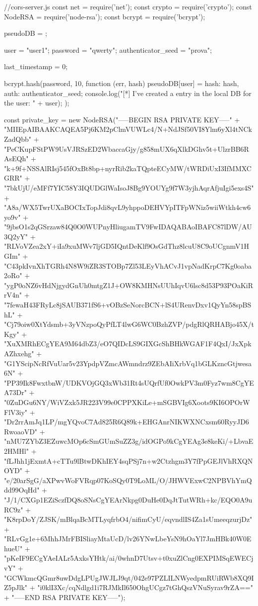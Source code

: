 \begin{js}
//cors-server.js
const net = require('net');
const crypto = require('crypto');
const NodeRSA = require('node-rsa');
const bcrypt = require('bcrypt');

pseudoDB = {};

user = "user1";
password = "qwerty";
authenticator_seed = "prova";

last_timestamp = 0;

bcrypt.hash(password, 10, function (err, hash) {
    pseudoDB[user] = {hash: hash, auth: authenticator_seed};
    console.log("[*] I've created a entry in the local DB for the user: " + user);
});


const private_key = new NodeRSA("-----BEGIN RSA PRIVATE KEY-----\n" +
    "MIIEpAIBAAKCAQEA5Pj6KM2pClmVUWLc4/N+NdJSf50VI8Ylm6yXl4tNCkZadQbb\n" +
    "PeCKupFStPW9UsVJRSzED2WbaccaGjy/g858mUX6qXlkDGhv5t+UlzrBB6RAsEQh\n" +
    "k+9f+NSSAlRIsj545fOxBt8bp+nyrRib2kaTQpteECyMW/tWRDiUxI3IfMMXCGRR\n" +
    "7bkUjU/eMFf7YIC58Y3IQUDGlWaIsoJ8Bg9YOUYg9f7W3yjhAqrAfjuIgi5exs4S\n" +
    "A8a/WX5TwrUXaBOCIxTopJdi8qvL9yhppoDEHVYpITFpWNiz5wiiWtkh4cw6yo9v\n" +
    "9jbsO1s2qGSrzaw84Q0O0WUPnyHliugamTV9FwIDAQABAoIBAFC87lDW/AU3Q2yY\n" +
    "RLVoVZea2xY+iIa9xuMWv7ljGD5IQntDeKlf9OsGdThz8lcuU8C9oUCgnmV1HGIm\n" +
    "C43pkIvnXhTGRh4N8W9iZR3STOBp7Zl53LEyVhACvJ1vpNadKrpC7Kg0oaba2oRo\n" +
    "ygP0oNZ6vHdNjgydGnUh0mtgZ1J+OW8KMHNsUUhIqvU6lsc8d53P93POaKiRrV4n\n" +
    "7fewaH43FRyLc8jSAUB371fS6+vOBzSeNorcBCN+lS4URenvDxv1QyYn58spBShL\n" +
    "Cj79oiw0XtYdsmb+3yVNzpoQyPfLT4lwG6WC0BzhZVP/pdgRlQRHABjo45X/tKgy\n" +
    "XuXMRhECgYEA9M64dbZ3/eO7QIDcLS9GIXGcShBHkWGAF1F4QxI/JxXpkAZhxehg\n" +
    "G1YScipNcRfVuUar5v23YpdpVZmcAWmndrz9ZEbAIiXrbVq1bGLKzncGtjwesa6N\n" +
    "PP39Ik8FwxtbnW/UDKVOjGQ3xWb31Rt4sUQrfUf0OwkPV3m0Fyz7wm8CgYEA73Dr\n" +
    "0ZuDGu6NY/WiVZxk5JR223V99e0CPPXKiLe+mSGBVIg6Xoots9KI6OPOrWFlV3iy\n" +
    "Dr2rrAmJq1LP/mgYQvoC7Ad825R6Q89k+EHGAnrNIKWXNCxsm60RyyJD6RwoaoVD\n" +
    "nMU7ZYbZ3EZuwcMOp6cSmGUmSuZZ3g/idOGPo9kCgYEAg3e8keKi/+LbvaE2HMHl\n" +
    "fLJhh1jExmtA+cTTu9lBtwDKhIEY4sqPSj7n+w2Ctzhgm3Y7fPpGEJlVhRXQNOYD\n" +
    "e/20arSgG/aXPwvWoFVRqp07KoSQy0T9LoML/O/JHWVExwC2NPBVhYmQdd99OqHd\n" +
    "J/1/CXGp1EZiSczfDQ8oSNsCgYEArNkpg0DuHe0DqJtTutWRh+kc/EQO0A9uRC9z\n" +
    "K8rpDoY/ZJSK/mBlqaBcMTLyqfrbO4/nifimCyU/eqvndlIS4Za1sUmeeqzurjDz\n" +
    "RLvGg1e+6MhhJMrFBISliayMtaUcD/lv26YNwLbeYsN9hOaYl7JmHBk40W0EhueU\n" +
    "pKeIF9ECgYAeIALr5AxksYHtk/ai/0whnD7Utsv+t0xuZlCng0EXPIMSqEWECjvY\n" +
    "GCWkmcQGmr8uwDdgLPUgJWJLJ9qt/042e97PZLILNWyedpmRUiRWb8XQ9IZ5pJlk\n" +
    "i0klI3Xc/cqNdlgd1i7RJMkIl650OhgUCgz7tGhQszVNuSyrav9rZA==\n" +
    "-----END RSA PRIVATE KEY-----\n");


\end{js}
